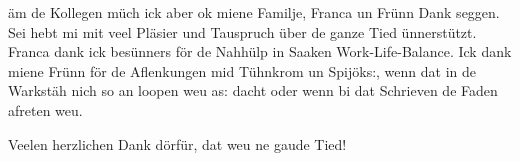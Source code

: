 \begin{otherlanguage}{ngerman}
äm de Kollegen müch ick aber ok miene Familje, Franca un Frünn Dank seggen. Sei hebt mi mit veel Pläsier und Tauspruch über de ganze Tied ünnerstützt. Franca dank ick besünners för de Nahhülp in Saaken Work-Life-Balance.
Ick dank miene Frünn för de Aflenkungen mid Tühnkrom un Spijöks:, wenn dat in de Warkstäh nich so an loopen weu as: dacht oder wenn bi dat Schrieven de Faden afreten weu.

Veelen herzlichen Dank dörfür, dat weu ne gaude Tied!

\end{otherlanguage}

